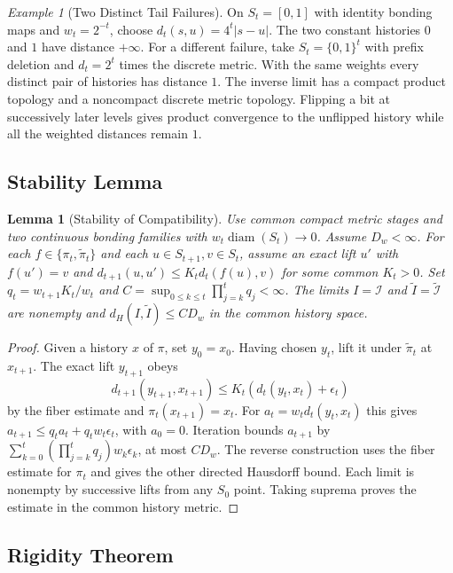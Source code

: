 \documentclass[11pt,a4paper]{article}
\theoremstyle{plain}
\newtheorem{lemma}[theorem]{Lemma}
\theoremstyle{definition}
\theoremstyle{remark}
\newtheorem{example}[theorem]{Example}
\begin{document}
\begin{example}[Two Distinct Tail Failures]\label{ex:weighted-tail-failures}
On $S_t=[0,1]$ with identity bonding maps and $w_t=2^{-t}$, choose $d_t(s,u)=4^t|s-u|$. The two constant histories $0$ and $1$ have distance $+\infty$. For a different failure, take $S_t=\{0,1\}^t$ with prefix deletion and $d_t=2^t$ times the discrete metric. With the same weights every distinct pair of histories has distance $1$. The inverse limit has a compact product topology and a noncompact discrete metric topology. Flipping a bit at successively later levels gives product convergence to the unflipped history while all the weighted distances remain $1$.
\end{example}

\subsection{Stability Lemma}

\begin{lemma}[Stability of Compatibility]\label{lem:stability}
Use common compact metric stages and two continuous bonding families with $w_t\operatorname{diam}(S_t)\to0$. Assume $D_w<\infty$. For each $f\in\{\pi_t,\widetilde\pi_t\}$ and each $u\in S_{t+1},v\in S_t$, assume an exact lift $u'$ with $f(u')=v$ and $d_{t+1}(u,u')\leq K_t d_t(f(u),v)$ for some common $K_t>0$. Set $q_t=w_{t+1}K_t/w_t$ and $C=\sup_{0\leq k\leq t}\prod_{j=k}^t q_j<\infty$. The limits $I=\mathcal I$ and $\widetilde I=\widetilde{\mathcal I}$ are nonempty and $d_H(I,\widetilde I)\leq C D_w$ in the common history space.
\end{lemma}
\begin{proof}
Given a history $x$ of $\pi$, set $y_0=x_0$. Having chosen $y_t$, lift it under $\widetilde\pi_t$ at $x_{t+1}$. The exact lift $y_{t+1}$ obeys
\[
 d_{t+1}(y_{t+1},x_{t+1})\le K_t(d_t(y_t,x_t)+\epsilon_t)
\]
by the fiber estimate and $\pi_t(x_{t+1})=x_t$. For $a_t=w_t d_t(y_t,x_t)$ this gives $a_{t+1}\le q_t a_t+q_t w_t\epsilon_t$, with $a_0=0$. Iteration bounds $a_{t+1}$ by $\sum_{k=0}^t (\prod_{j=k}^t q_j)w_k\epsilon_k$, at most $C D_w$. The reverse construction uses the fiber estimate for $\pi_t$ and gives the other directed Hausdorff bound. Each limit is nonempty by successive lifts from any $S_0$ point. Taking suprema proves the estimate in the common history metric.
\end{proof}

\subsection{Rigidity Theorem}
\end{document}

